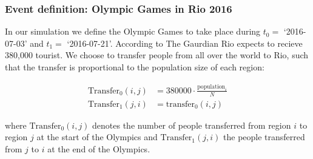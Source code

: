 \subsubsection{Event definition: Olympic Games in Rio 2016}
In our simulation we define the Olympic Games to take place during $t_0=$ `2016-07-03' and $t_1=$ `2016-07-21'. According to The Gaurdian \cite{theguardian-olympics} Rio expects to recieve 380,000 tourist. We choose to transfer people from all over the world to Rio, such that the transfer is proportional to the population size of each region:

\begin{align}
	\text{Transfer}_0(i, j) &= 380000 \cdot \frac{\text{population}_i}{N} \\
	\text{Transfer}_1(j, i) &= \text{transfer}_0(i, j)
\end{align}

where $\text{Transfer}_0(i, j)$ denotes the number of people transferred from region $i$ to region $j$ at the start of the Olympics and $ \text{Transfer}_1(j, i) $ the people transferred from $j$ to $i$ at the end of the Olympics.
